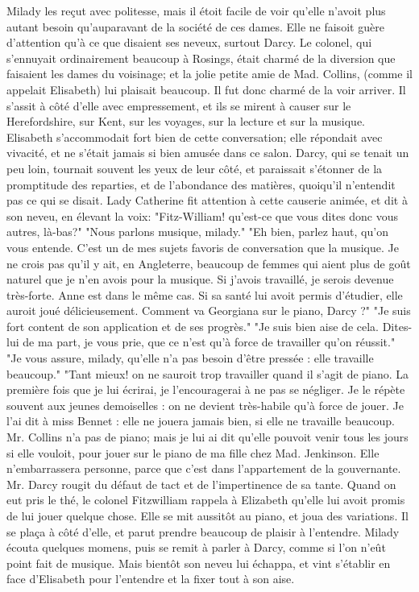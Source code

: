 Milady les reçut avec politesse, mais il étoit facile de voir qu'elle n'avoit plus autant besoin qu'auparavant de la société de ces dames. Elle ne faisoit guère d'attention\setcounter{page}{540} qu'à ce que disaient ses neveux, surtout Darcy.
Le colonel, qui s'ennuyait ordinairement beaucoup à Rosings, était charmé de la diversion que faisaient les dames du voisinage; et la jolie petite amie de Mad. Collins, (comme il appelait Elisabeth) lui plaisait beaucoup. Il fut donc charmé de la voir arriver. Il s'assit à côté d'elle avec empressement, et ils se mirent à causer sur le Herefordshire, sur Kent, sur les voyages, sur la lecture et sur la musique. Elisabeth s'accommodait fort bien de cette conversation; elle répondait avec vivacité, et ne s'était jamais si bien amusée dans ce salon. Darcy, qui se tenait un peu loin, tournait souvent les yeux de leur côté, et paraissait s'étonner de la promptitude des reparties, et de l'abondance des matières, quoiqu'il n'entendit pas ce qui se disait. Lady Catherine fit attention à cette causerie animée, et dit à son neveu, en élevant la voix: "Fitz-William! qu'est-ce que vous dites donc vous autres, là-bas?" "Nous parlons musique, milady." "Eh bien, parlez haut, qu'on vous entende. C'est un de mes sujets favoris de conversation que la musique. Je ne crois pas qu'il y ait, en Angleterre, beaucoup de femmes qui aient plus de goût naturel que\setcounter{page}{541} je n'en avois pour la musique. Si j'avois travaillé, je serois devenue très-forte. Anne est dans le même cas. Si sa santé lui avoit permis d'étudier, elle auroit joué délicieusement. Comment va Georgiana sur le piano, Darcy ?"
"Je suis fort content de son application et de ses progrès."
"Je suis bien aise de cela. Dites-lui de ma part, je vous prie, que ce n'est qu'à force de travailler qu'on réussit."
"Je vous assure, milady, qu'elle n'a pas besoin d'être pressée : elle travaille beaucoup."
"Tant mieux! on ne sauroit trop travailler quand il s'agit de piano. La première fois que je lui écrirai, je l'encouragerai à ne pas se négliger. Je le répète souvent aux jeunes demoiselles : on ne devient très-habile qu'à force de jouer. Je l'ai dit à miss Bennet : elle ne jouera jamais bien, si elle ne travaille beaucoup. Mr. Collins n'a pas de piano; mais je lui ai dit qu'elle pouvoit venir tous les jours si elle vouloit, pour jouer sur le piano de ma fille chez Mad. Jenkinson. Elle n'embarrassera personne, parce que c'est dans l'appartement de la gouvernante.
\setcounter{page}{542}
Mr. Darcy rougit du défaut de tact et de l'impertinence de sa tante.
Quand on eut pris le thé, le colonel Fitzwilliam rappela à Elizabeth qu'elle lui avoit promis de lui jouer quelque chose. Elle se mit aussitôt au piano, et joua des variations. Il se plaça à côté d'elle, et parut prendre beaucoup de plaisir à l'entendre. Milady écouta quelques momens, puis se remit à parler à Darcy, comme si l'on n'eût point fait de musique. Mais bientôt son neveu lui échappa, et vint s'établir en face d'Elisabeth pour l'entendre et la fixer tout à son aise.
